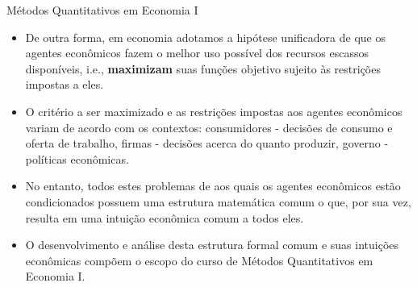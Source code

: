 \documentclass[10pt]{beamer}
\begin{document}
\begin{frame}{Métodos Quantitativos em Economia I}
    \begin{itemize}
        \item De outra forma, em economia adotamos a hipótese unificadora de que os agentes econômicos fazem o melhor uso possível dos recursos escassos disponíveis, i.e., \textbf{maximizam} suas funções objetivo sujeito às restrições impostas a eles.\medskip

        \item O critério a ser maximizado e as restrições impostas aos agentes econômicos variam de acordo com os contextos: consumidores - decisões de consumo e oferta de trabalho, firmas - decisões acerca do quanto produzir, governo - políticas econômicas.\medskip

        \item No entanto, todos estes problemas de  aos quais os agentes econômicos estão condicionados possuem uma estrutura matemática comum o que, por sua vez, resulta em uma intuição econômica comum a todos eles.\medskip

        \item O desenvolvimento e análise desta estrutura formal comum e suas intuições econômicas compõem o escopo do curso de Métodos Quantitativos em Economia I.
    \end{itemize}
\end{frame}
\end{document}
